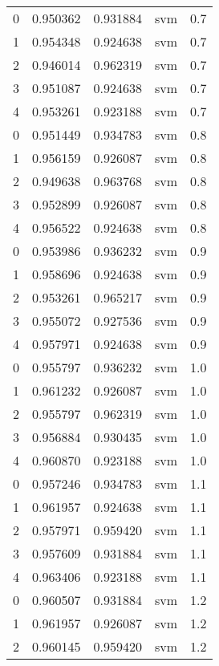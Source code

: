 \begin{tabular}{rrrlr}
     0 & 0.950362 & 0.931884 &      svm &        0.7 \\
     1 & 0.954348 & 0.924638 &      svm &        0.7 \\
     2 & 0.946014 & 0.962319 &      svm &        0.7 \\
     3 & 0.951087 & 0.924638 &      svm &        0.7 \\
     4 & 0.953261 & 0.923188 &      svm &        0.7 \\
     0 & 0.951449 & 0.934783 &      svm &        0.8 \\
     1 & 0.956159 & 0.926087 &      svm &        0.8 \\
     2 & 0.949638 & 0.963768 &      svm &        0.8 \\
     3 & 0.952899 & 0.926087 &      svm &        0.8 \\
     4 & 0.956522 & 0.924638 &      svm &        0.8 \\
     0 & 0.953986 & 0.936232 &      svm &        0.9 \\
     1 & 0.958696 & 0.924638 &      svm &        0.9 \\
     2 & 0.953261 & 0.965217 &      svm &        0.9 \\
     3 & 0.955072 & 0.927536 &      svm &        0.9 \\
     4 & 0.957971 & 0.924638 &      svm &        0.9 \\
     0 & 0.955797 & 0.936232 &      svm &        1.0 \\
     1 & 0.961232 & 0.926087 &      svm &        1.0 \\
     2 & 0.955797 & 0.962319 &      svm &        1.0 \\
     3 & 0.956884 & 0.930435 &      svm &        1.0 \\
     4 & 0.960870 & 0.923188 &      svm &        1.0 \\
     0 & 0.957246 & 0.934783 &      svm &        1.1 \\
     1 & 0.961957 & 0.924638 &      svm &        1.1 \\
     2 & 0.957971 & 0.959420 &      svm &        1.1 \\
     3 & 0.957609 & 0.931884 &      svm &        1.1 \\
     4 & 0.963406 & 0.923188 &      svm &        1.1 \\
     0 & 0.960507 & 0.931884 &      svm &        1.2 \\
     1 & 0.961957 & 0.926087 &      svm &        1.2 \\
     2 & 0.960145 & 0.959420 &      svm &        1.2 \\

\end{tabular}
